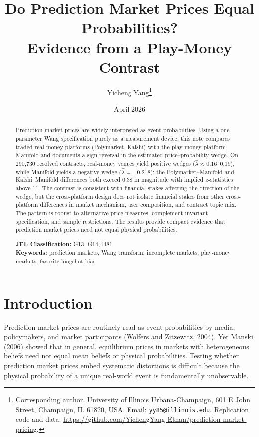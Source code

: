 \documentclass[12pt]{article}
\title{Do Prediction Market Prices Equal Probabilities?\\Evidence from a Play-Money Contrast}
\author{Yicheng Yang\thanks{Corresponding author. University of Illinois Urbana-Champaign, 601 E John Street, Champaign, IL 61820, USA. Email: \texttt{yy85@illinois.edu}. Replication code and data: \url{https://github.com/YichengYang-Ethan/prediction-market-pricing}.}}
\date{April 2026}
\begin{document}
\maketitle

\begin{abstract}
\noindent Prediction market prices are widely interpreted as event probabilities. Using a one-parameter Wang specification purely as a measurement device, this note compares traded real-money platforms (Polymarket, Kalshi) with the play-money platform Manifold and documents a sign reversal in the estimated price--probability wedge. On 290,730 resolved contracts, real-money venues yield positive wedges ($\hat\lambda \approx 0.16$--$0.19$), while Manifold yields a negative wedge ($\hat\lambda = -0.218$); the Polymarket--Manifold and Kalshi--Manifold differences both exceed 0.38 in magnitude with implied $z$-statistics above 11. The contrast is consistent with financial stakes affecting the direction of the wedge, but the cross-platform design does not isolate financial stakes from other cross-platform differences in market mechanism, user composition, and contract topic mix. The pattern is robust to alternative price measures, complement-invariant specification, and sample restrictions. The results provide compact evidence that prediction market prices need not equal physical probabilities.

\medskip
\noindent\textbf{JEL Classification:} G13, G14, D81\\
\noindent\textbf{Keywords:} prediction markets, Wang transform, incomplete markets, play-money markets, favorite-longshot bias
\end{abstract}

\newpage

\section{Introduction}

Prediction market prices are routinely read as event probabilities by media, policymakers, and market participants (Wolfers and Zitzewitz, 2004). Yet Manski (2006) showed that in general, equilibrium prices in markets with heterogeneous beliefs need not equal mean beliefs or physical probabilities. Testing whether prediction market prices embed systematic distortions is difficult because the physical probability of a unique real-world event is fundamentally unobservable.
\end{document}
